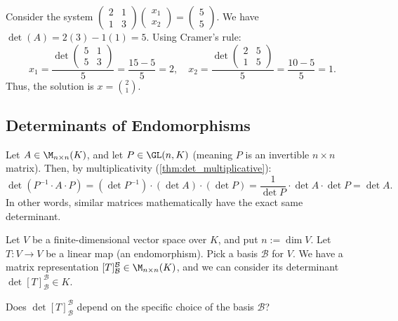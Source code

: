\begin{example}
  Consider the system $\left(\begin{smallmatrix} 2 & 1 \\ 1 & 3 \end{smallmatrix}\right) \left(\begin{smallmatrix} x_1 \\ x_2 \end{smallmatrix}\right) = \left(\begin{smallmatrix} 5 \\ 5 \end{smallmatrix}\right)$. We have $\det(A) = 2(3) - 1(1) = 5$. Using Cramer's rule:
  \[
  x_1 = \frac{\det \begin{pmatrix} 5 & 1 \\ 5 & 3 \end{pmatrix}}{5} = \frac{15 - 5}{5} = 2, \quad x_2 = \frac{\det \begin{pmatrix} 2 & 5 \\ 1 & 5 \end{pmatrix}}{5} = \frac{10 - 5}{5} = 1.
  \]
  Thus, the solution is $x = \binom{2}{1}$.
\end{example}

\subsection{Determinants of Endomorphisms}

\begin{warmup} Let $A \in \M_{n \times n}(K)$, and let $P \in \GL(n, K)$ (meaning $P$ is an invertible $n \times n$ matrix). Then, by multiplicativity (\cref{thm:det_multiplicative}):
  \[
  \det(P^{-1} \cdot A \cdot P) = (\det P^{-1}) \cdot (\det A) \cdot (\det P) = \frac{1}{\det P} \cdot \det A \cdot \det P = \det A.
  \]
  In other words, similar matrices mathematically have the exact same determinant.
\end{warmup}

Let $V$ be a finite-di\-men\-sional vector space over $K$, and put $n := \dim V$. Let $T : V \to V$ be a linear map (an endomorphism). Pick a basis $\mathcal{B}$ for $V$. We have a matrix representation $[T]_{\mathcal{B}}^{\mathcal{B}} \in \M_{n \times n}(K)$, and we can consider its determinant $\det [T]_{\mathcal{B}}^{\mathcal{B}} \in K$.

\begin{question} Does $\det [T]_{\mathcal{B}}^{\mathcal{B}}$ depend on the specific choice of the basis $\mathcal{B}$?
\end{question}

